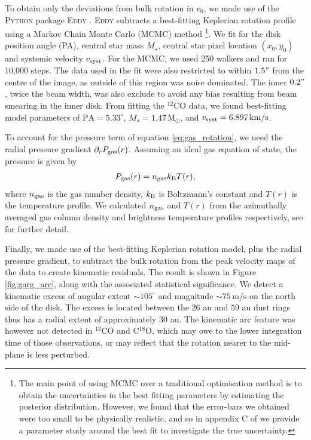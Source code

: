 To obtain only the deviations from bulk rotation in $v_0$, we made use of the \textsc{Python} package \textsc{Eddy} \citep{teague2019}.
\textsc{Eddy} subtracts a best-fitting Keplerian rotation profile using a Markov Chain Monte Carlo (MCMC) method \citep{foreman-mackey2013}\footnote{The main point of using MCMC over a traditional optimisation method is to obtain the uncertainties in the best fitting parameters by estimating the posterior distribution. However, we found that the error-bars we obtained were too small to be physically realistic, and so in appendix C of \citet{garg2022} we provide a parameter study around the best fit to investigate the true uncertainty.}.
We fit for the disk position angle (PA), central star mass $M_\star$, central star pixel location $(x_0,y_0)$ and systemic velocity $v_{\rm syst}$.
For the MCMC, we used 250 walkers and ran for 10,000 steps.
The data used in the fit were also restricted to within $1.5"$ from the centre of the image, as outside of this region was noise dominated.
The inner $0.2"$, twice the beam width, was also exclude to avoid any bias resulting from beam smearing in the inner disk.
From fitting the $^{12}$CO data, we found best-fitting model parameters of $\mathrm{PA} = 5.33^\circ$, $M_\star = 1.47 \, \mathrm{M_\odot}$, and $v_{\rm syst} = 6.897 \, \mathrm{km/s}$.

To account for the pressure term of equation \ref{eq:gas_rotation}, we need the radial pressure gradient $\partial_r P_{\rm gas}(r)$.
Assuming an ideal gas equation of state, the pressure is given by 
\begin{align}
    P_{\rm gas}(r) = n_{\rm gas} k_{\rm B} T(r),
\end{align}
where $n_{\rm gas}$ is the gas number density, $k_{\rm B}$ is Boltzmann's constant and $T(r)$ is the temperature profile.
We calculated $n_{\rm gas}$ and $T(r)$ from the azimuthally averaged gas column density and brightness temperature profiles respectively, see \citet{garg2022} for further detail.

Finally, we made use of the best-fitting Keplerian rotation model, plus the radial pressure gradient, to subtract the bulk rotation from the peak velocity maps of the data to create kinematic residuals.
The result is shown in Figure \ref{fig:garg_arc}, along with the associated statistical significance.
We detect a kinematic excess of angular extent $\sim 105^\circ$ and magnitude $\sim 75 \, \mathrm{m/s}$ on the north side of the disk.
The excess is located between the $26$ au and $59$ au dust rings thus has a radial extent of approximately $30$ au.
The kinematic arc feature was however not detected in $^{13}$CO and C$^{18}$O, which may owe to the lower integration time of those observations, or may reflect that the rotation nearer to the mid-plane is less perturbed.

